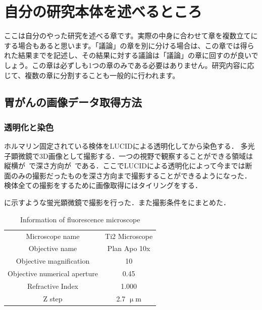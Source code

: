 \chapter{自分の研究本体を述べるところ}
ここは自分のやった研究を述べる章です。実際の中身に合わせて章を複数立てにする場合もあると思います。「議論」の章を別に分ける場合は、この章では得られた結果までを記述し、その結果に対する議論は「議論」の章に回すのが良いでしょう。この章は必ずしも1つの章のみである必要はありません。研究内容に応じて、複数の章に分割することも一般的に行われます。

\section{胃がんの画像データ取得方法}

\subsection{透明化と染色}
ホルマリン固定されている検体をLUCIDによる透明化してから染色する．
多光子顕微鏡で3D画像として撮影する．一つの視野で観察することができる領域は縦横が~で深さ方向が~である．ここでLUCIDによる透明化によって今までは断面のみの撮影だったものを深さ方向まで撮影することができるようになった．
検体全ての撮影をするために画像取得にはタイリングをする．

に示すような蛍光顕微鏡で撮影を行った．また撮影条件をにまとめた．

\begin{table}[H]
	\centering
	\caption{Information of fluorescence microscope}
	\label{tab:蛍光顕微鏡}
	\begin{tabular}{cc}\toprule
		Microscope name & Ti2 Microscope \\ 
		Objective name & Plan Apo 10x \\ 
		Objective magnification & 10 \\ 
		Objective numerical aperture & 0.45 \\ 
		Refractive Index & 1.000 \\
		Z step & 2.7 $\upmu$m \\ \bottomrule
	\end{tabular} 
\end{table}

